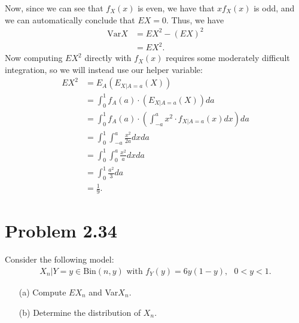 \documentclass[10pt,a4paper]{article}
\theoremstyle{theorem}
\theoremstyle{definition}
\begin{document}
Now, since we can see that $f_X(x)$ is even, we have that $xf_X(x)$ is odd, and we can automatically conclude that $\boxed{EX = 0}$. Thus, we have
\begin{align*}
\text{Var}X &= EX^2 - (EX)^2\\
&= EX^2.
\end{align*}
Now computing $EX^2$ directly with $f_X(x)$ requires some moderately difficult integration, so we will instead use our helper variable:
\begin{align*}
EX^2 &= E_{A}(E_{X|A = a}(X))\\
&= \int_0^1 f_A(a) \cdot (E_{X|A = a}(X)) da\\
&= \int_0^1 f_A(a) \cdot \left(\int_{-a}^a x^2 \cdot f_{X|A = a}(x) dx \right) da\\
&= \int_0^1 \int_{-a}^a \frac{x^2}{2a} dx da\\
&= \int_0^1 \int_{0}^a \frac{x^2}{a} dx da\\
&= \int_0^1 \frac{a^2}{3}da\\
&= \boxed{\frac{1}{9}}.
\end{align*}

\section*{Problem 2.34}
Consider the following model:
\begin{align*}
X_n | Y = y \in \text{Bin}(n, y) \text{ with } f_Y(y) = 6y(1-y), \text{ } 0 < y < 1.
\end{align*}
\begin{enumerate}
\item[(a)] Compute $EX_n$ and Var$X_n$.
\item[(b)] Determine the distribution of $X_n$.
\end{enumerate}
\end{document}
